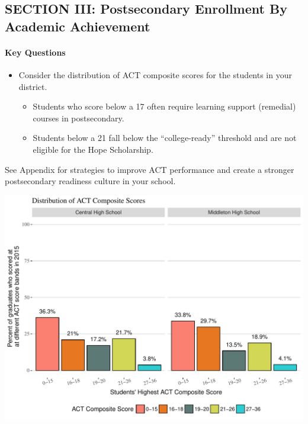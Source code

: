 \documentclass[11pt,]{article}
\providecommand{\tightlist}{%
  \setlength{\itemsep}{0pt}\setlength{\parskip}{0pt}}
\let\oldparagraph\paragraph
\renewcommand{\paragraph}[1]{\oldparagraph{#1}\mbox{}}
\begin{document}
\newpage

\subsection{SECTION III: Postsecondary Enrollment By Academic
Achievement}\label{section-iii-postsecondary-enrollment-by-academic-achievement}

\paragraph{Key Questions}\label{key-questions-3}

\begin{itemize}
\tightlist
\item
  Consider the distribution of ACT composite scores for the students in
  your district.

  \begin{itemize}
  \tightlist
  \item
    Students who score below a 17 often require learning support
    (remedial) courses in postsecondary.
  \item
    Students below a 21 fall below the ``college-ready'' threshold and
    are not eligible for the Hope Scholarship.
  \end{itemize}
\end{itemize}

See Appendix for strategies to improve ACT performance and create a
stronger postsecondary readiness culture in your school.

\includegraphics{20170411_PSWRR_no_CTE_files/figure-latex/ACT_distribution-1.pdf}
\end{document}
